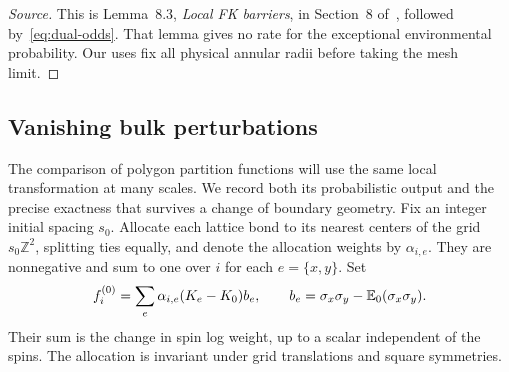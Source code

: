 \begin{proof}[Source]
This is Lemma~8.3, \emph{Local FK barriers}, in Section~8 of~\cite{Q},
followed by~\eqref{eq:dual-odds}.  That lemma gives no rate for the
exceptional environmental probability.  Our uses fix all physical
annular radii before taking the mesh limit.
\end{proof}

\subsection{Vanishing bulk perturbations}

The comparison of polygon partition functions will use the same local
transformation at many scales.  We record both its probabilistic output
and the precise exactness that survives a change of boundary geometry.
Fix an integer initial spacing $s_0$.  Allocate each lattice bond to its
nearest centers of the grid $s_0\mathbb Z^2$, splitting ties equally,
and denote the allocation weights by $\alpha_{i,e}$.  They are
nonnegative and sum to one over $i$ for each $e=\{x,y\}$.  Set
\begin{equation}
 f_i^{(0)}=\sum_e\alpha_{i,e}(K_e-K_0)b_e,
 \qquad b_e=\sigma_x\sigma_y-\mathbb E_0(\sigma_x\sigma_y).
 \label{eq:initial-logs}
\end{equation}
Their sum is the change in spin log weight, up to a scalar independent
of the spins.  The allocation is invariant under grid translations
and square symmetries.

